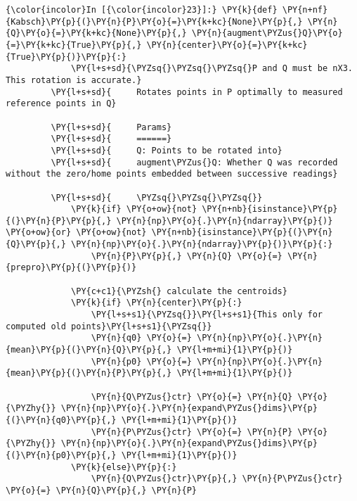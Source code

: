     \begin{Verbatim}[commandchars=\\\{\}]
{\color{incolor}In [{\color{incolor}23}]:} \PY{k}{def} \PY{n+nf}{Kabsch}\PY{p}{(}\PY{n}{P}\PY{o}{=}\PY{k+kc}{None}\PY{p}{,} \PY{n}{Q}\PY{o}{=}\PY{k+kc}{None}\PY{p}{,} \PY{n}{augment\PYZus{}Q}\PY{o}{=}\PY{k+kc}{True}\PY{p}{,} \PY{n}{center}\PY{o}{=}\PY{k+kc}{True}\PY{p}{)}\PY{p}{:}
             \PY{l+s+sd}{\PYZsq{}\PYZsq{}\PYZsq{}P and Q must be nX3. This rotation is accurate.}
         \PY{l+s+sd}{     Rotates points in P optimally to measured reference points in Q}
         
         \PY{l+s+sd}{     Params}
         \PY{l+s+sd}{     ======}
         \PY{l+s+sd}{     Q: Points to be rotated into}
         \PY{l+s+sd}{     augment\PYZus{}Q: Whether Q was recorded without the zero/home points embedded between successive readings}
         
         \PY{l+s+sd}{     \PYZsq{}\PYZsq{}\PYZsq{}}
             \PY{k}{if} \PY{o+ow}{not} \PY{n+nb}{isinstance}\PY{p}{(}\PY{n}{P}\PY{p}{,} \PY{n}{np}\PY{o}{.}\PY{n}{ndarray}\PY{p}{)} \PY{o+ow}{or} \PY{o+ow}{not} \PY{n+nb}{isinstance}\PY{p}{(}\PY{n}{Q}\PY{p}{,} \PY{n}{np}\PY{o}{.}\PY{n}{ndarray}\PY{p}{)}\PY{p}{:}
                 \PY{n}{P}\PY{p}{,} \PY{n}{Q} \PY{o}{=} \PY{n}{prepro}\PY{p}{(}\PY{p}{)}
         
             \PY{c+c1}{\PYZsh{} calculate the centroids}
             \PY{k}{if} \PY{n}{center}\PY{p}{:}
                 \PY{l+s+s1}{\PYZsq{}}\PY{l+s+s1}{This only for computed old points}\PY{l+s+s1}{\PYZsq{}}
                 \PY{n}{q0} \PY{o}{=} \PY{n}{np}\PY{o}{.}\PY{n}{mean}\PY{p}{(}\PY{n}{Q}\PY{p}{,} \PY{l+m+mi}{1}\PY{p}{)}
                 \PY{n}{p0} \PY{o}{=} \PY{n}{np}\PY{o}{.}\PY{n}{mean}\PY{p}{(}\PY{n}{P}\PY{p}{,} \PY{l+m+mi}{1}\PY{p}{)}
         
                 \PY{n}{Q\PYZus{}ctr} \PY{o}{=} \PY{n}{Q} \PY{o}{\PYZhy{}} \PY{n}{np}\PY{o}{.}\PY{n}{expand\PYZus{}dims}\PY{p}{(}\PY{n}{q0}\PY{p}{,} \PY{l+m+mi}{1}\PY{p}{)}
                 \PY{n}{P\PYZus{}ctr} \PY{o}{=} \PY{n}{P} \PY{o}{\PYZhy{}} \PY{n}{np}\PY{o}{.}\PY{n}{expand\PYZus{}dims}\PY{p}{(}\PY{n}{p0}\PY{p}{,} \PY{l+m+mi}{1}\PY{p}{)}
             \PY{k}{else}\PY{p}{:}
                 \PY{n}{Q\PYZus{}ctr}\PY{p}{,} \PY{n}{P\PYZus{}ctr} \PY{o}{=} \PY{n}{Q}\PY{p}{,} \PY{n}{P}
         

\end{Verbatim}
